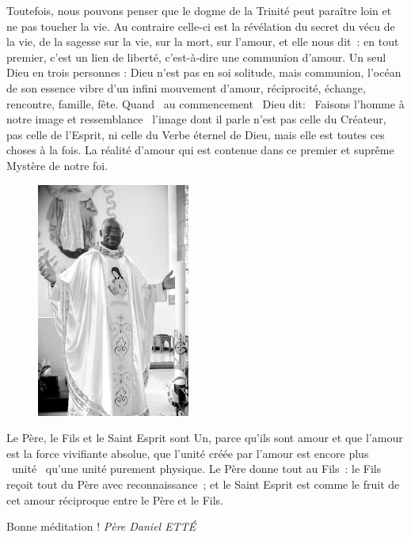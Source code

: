 Toutefois, nous pouvons penser que le dogme de la Trinité peut paraître loin et ne pas toucher la vie. Au contraire celle-ci est la révélation du secret du vécu de la vie, de la sagesse sur la vie, sur la mort, sur l’amour, et elle nous dit : en tout premier, c’est un lien de liberté, c’est-à-dire une communion d’amour. Un seul Dieu en trois personnes : Dieu n’est pas en soi solitude, mais communion, l’océan de son essence vibre d’un infini mouvement d’amour, réciprocité, échange, rencontre, famille, fête.
Quand \og au commencement \fg{} Dieu dit: \og Faisons l’homme à notre image et ressemblance \fg{} l'image dont il parle n’est pas celle du Créateur, pas celle de l’Esprit, ni celle du Verbe éternel de Dieu, mais elle est toutes ces choses à la fois. La réalité d’amour qui est contenue dans ce premier et suprême Mystère de notre foi.
\begin{figure}
\vspace{-0.5cm}
	\includegraphics{../images/standing_daniel.png}
\end{figure}
Le Père, le Fils et le Saint Esprit sont Un, parce qu’ils sont amour et que l’amour est la force vivifiante absolue, que l’unité créée par l’amour est encore plus \og unité \fg{} qu’une unité purement physique. Le Père donne tout au Fils : le Fils reçoit tout du Père avec reconnaissance ; et le Saint Esprit est comme le fruit de cet amour réciproque entre le Père et le Fils.

\begin{flushright}
Bonne méditation !
\textit{Père  Daniel  ETTÉ}
\end{flushright}


